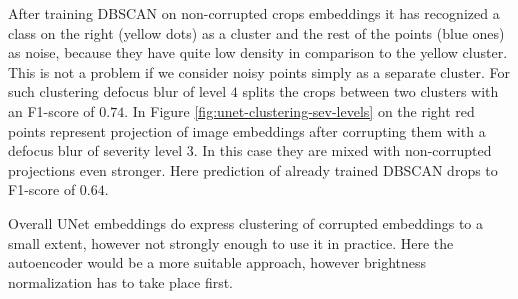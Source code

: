 After training DBSCAN on non-corrupted crops embeddings it has recognized a class on the right (yellow dots) as a cluster and the rest of the points (blue ones) as noise, because they have quite low density in comparison to the yellow cluster. This is not a problem if we consider noisy points simply as a separate cluster. For such clustering defocus blur of level $4$ splits the crops between two clusters with an F1-score of $0.74$. In Figure \ref{fig:unet-clustering-sev-levels} on the right red points represent projection of image embeddings after corrupting them with a defocus blur of severity level $3$. In this case they are mixed with non-corrupted projections even stronger. Here prediction of already trained DBSCAN drops to F1-score of $0.64$.

Overall UNet embeddings do express clustering of corrupted embeddings to a small extent, however not strongly enough to use it in practice. Here the autoencoder would be a more suitable approach, however brightness normalization has to take place first.